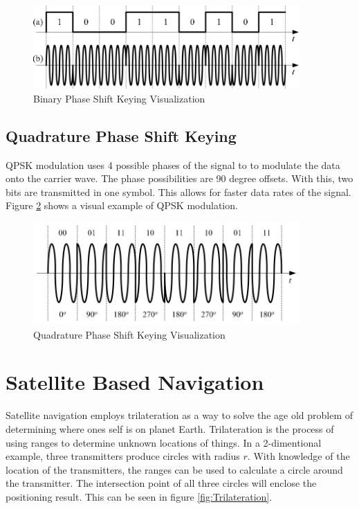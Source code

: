 \documentclass[12pt]{report}
\begin{document}
\begin{figure}[h]
    \centering
    \includegraphics[width=4.0in]{Example-of-BPSK-modulation-format-a-binary-signal-and-b-BPSK-modulated-signal.png}
    \caption{Binary Phase Shift Keying Visualization \cite{mahdirajiAdvancedModulationFormats2010} }
    \label{fig:BPSKsig}
\end{figure}
\subsection{Quadrature Phase Shift Keying}

QPSK modulation uses 4 possible phases of the signal to to modulate the data onto the carrier wave. The phase possibilities are 90 degree offsets. With this, two bits are transmitted in one symbol. This allows for faster data rates of the signal. Figure \ref{fig:QPSKmod} shows a visual example of QPSK modulation.

\begin{figure}[h]
    \centering
    \includegraphics[width=4.0in]{QPSK_sig.JPG}
    \caption{Quadrature Phase Shift Keying Visualization \cite{mahdirajiAdvancedModulationFormats2010} }
    \label{fig:QPSKmod}
\end{figure}

\section{Satellite Based Navigation}\label{sec:satellitenav}
Satellite navigation employs trilateration as a way to solve the age old problem of determining where ones self is on planet Earth. Trilateration is the process of using ranges to determine unknown locations of things. In a 2-dimentional example, three transmitters produce circles with radius $r$. With knowledge of the location of the transmitters, the ranges can be used to calculate a circle around the transmitter. The intersection point of all three circles will enclose the positioning result. This can be seen in figure \ref{fig:Trilateration}.
\end{document}
